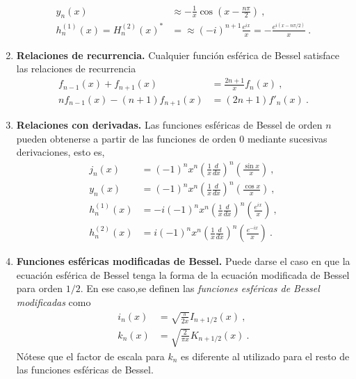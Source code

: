 \begin{propiedad}
\begin{enumerate}
\begin{align}
            y_n(x) & \approx - \frac{1}{x} \cos\left( x - \frac{n\pi}{2} \right) \ , \\
            h_n^{(1)}(x) = H_n^{(2)}(x)^\ast & = \approx (-i)^{n+1} \frac{e^{ix}}{x} = - \frac{e^{i(x-n\pi/2)}}{x} \ .
        \end{align}
        \item \textbf{Relaciones de recurrencia.} Cualquier función esférica de Bessel satisface las relaciones de recurrencia
        \begin{align}
            f_{n-1}(x) + f_{n+1}(x) & = \frac{2n+1}{x} f_n(x) \ , \\
            n f_{n-1}(x) - (n+1) f_{n+1}(x) & = (2n+1) f'_n(x) \ .
        \end{align}
        \item \textbf{Relaciones con derivadas.} Las funciones esféricas de Bessel de orden $n$ pueden obtenerse a partir de las funciones de orden 0 mediante sucesivas derivaciones, esto es,
        \begin{align}
            j_n(x) & = (-1)^n x^n \left( \frac{1}{x} \frac{d}{dx} \right)^n \left( \frac{\sin x}{x} \right) \ , \\
            y_n(x) & = (-1)^n x^n \left( \frac{1}{x} \frac{d}{dx} \right)^n \left( \frac{\cos x}{x} \right) \ , \\
            h_n^{(1)}(x) & = -i (-1)^n x^n \left( \frac{1}{x} \frac{d}{dx} \right)^n \left( \frac{e^{ix}}{x} \right) \ , \\
            h_n^{(2)}(x) & = i (-1)^n x^n \left( \frac{1}{x} \frac{d}{dx} \right)^n \left( \frac{e^{-ix}}{x} \right) \ .
        \end{align}
        \item \textbf{Funciones esféricas modificadas de Bessel.} Puede darse el caso en que la ecuación esférica de Bessel tenga la forma de la ecuación modificada de Bessel para orden $1/2$. En ese caso,se definen las \emph{funciones esféricas de Bessel modificadas} como
        \begin{align}
            i_n(x) & = \sqrt{\frac{\pi}{2x}} I_{n+1/2}(x) \ , \\
            k_n(x) & = \sqrt{\frac{2}{\pi x}} K_{n+1/2}(x) \ .
        \end{align} 
        Nótese que el factor de escala para $k_n$ es diferente al utilizado para el resto de las funciones esféricas de Bessel.
    \end{enumerate}
\end{propiedad}



